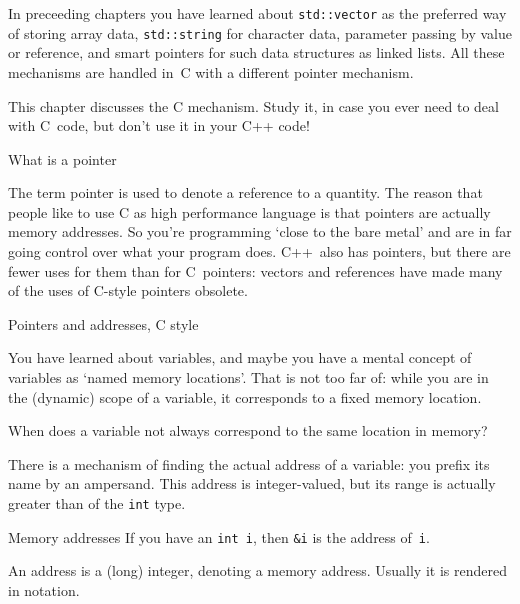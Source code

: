 
In preceeding chapters you have learned about
\lstinline{std::vector} as the preferred way of storing array data,
\lstinline{std::string} for character data,
parameter passing by value or reference,
and smart pointers for such data structures as linked lists.
All these mechanisms are handled in~C with
a different pointer mechanism.

This chapter discusses the C mechanism.
Study it, in case you ever need to deal with C~code,
but don't use it in your C++ code!

 {What is a pointer}

The term pointer is used to denote a reference to a quantity. The
reason that people like to use C as high performance language is that
pointers are actually memory addresses. So you're programming `close
to the bare metal' and are in far going control over what your program
does. C++~also has pointers, but there are fewer uses for them than
for C~pointers: vectors and references have made many of the uses
of C-style pointers obsolete.

 {Pointers and addresses, C style}
\label{sec:cderef}

You have learned about variables, and maybe you have a mental concept
of variables as `named memory locations'. That is not too far of:
while you are in the (dynamic) scope of a variable, it corresponds to
a fixed memory location.

\begin{exercise}
  \label{ex:varmemscope}
  When does a variable not always correspond to the same location in
  memory?
\end{exercise}

There is a mechanism of finding the actual address of a variable: you
prefix its name by an ampersand. 
This address is integer-valued, but
its range is actually greater than of the \lstinline{int} type.

\begin{block}{Memory addresses}
  \label{sl:ampersand}
  If you have an \lstinline{int i}, then \lstinline{&i} is the address of~\lstinline{i}.

An address is a (long) integer, denoting a memory address. Usually it
is rendered in  notation.
%
\end{block}

